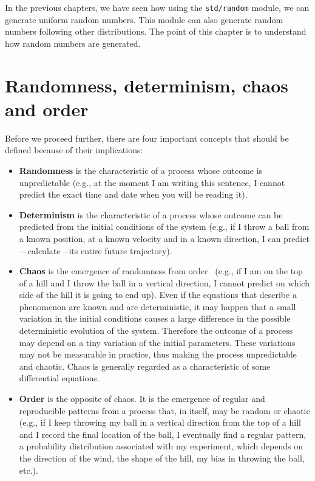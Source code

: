 \documentclass[justified, sixbynine]{tufte-book}
\def\ft{\small\tt}
\theoremstyle{plain}%
\newtheorem * {corollary}{Corollary}
\theoremstyle{definition}
\theoremstyle{remark}
\newtheorem * {remark}{Remark}
\newtheorem * {note}{Note}
\begin{document}
\begin{fullwidth}
In the previous chapters, we have seen how using the {\ft std/random} module, we can generate uniform random numbers. This module can also
generate random numbers following other distributions.
The point of this chapter is to understand how random numbers are generated.

\goodbreak\section{Randomness, determinism, chaos and order}

Before we proceed further, there are four important concepts that should be defined because of their implications:

\begin{itemize}
\item  {\bf Randomness} is the characteristic of a process whose outcome is
unpredictable (e.g., at the moment I am writing this sentence, I cannot
predict the exact time and date when you will be reading it).

\item  {\bf Determinism} is the characteristic of a process whose outcome
can be predicted from the initial conditions of the system (e.g., if I throw a
ball from a known position, at a known velocity and in a known direction, I
can predict---calculate---its entire future trajectory).

\item  {\bf Chaos} is the emergence of randomness from order~\cite{lorenz}
(e.g., if I am on the
top of a hill and I throw the ball in a vertical direction, I cannot predict on
which side of the hill it is going to end up). Even if the equations that
describe a phenomenon are known and are deterministic, it may happen that a
small variation in the initial conditions causes a large difference in the
possible deterministic evolution of the system. Therefore the outcome of a
process may depend on a tiny variation of the initial parameters. These
variations may not be measurable in practice, thus making the process
unpredictable and chaotic. Chaos is generally regarded as a characteristic
of some differential equations.

\item  {\bf Order} is the opposite of chaos. It is the emergence of regular
and reproducible patterns from a process that, in itself, may be random or
chaotic (e.g., if I keep throwing my ball in a vertical direction from
the top of a hill and I record the final location of the ball, I eventually
find a regular pattern, a probability distribution associated with my
experiment, which depends on the direction of the wind, the shape of the
hill, my bias in throwing the ball, etc.).
\end{itemize}


\end{fullwidth}
\end{document}
